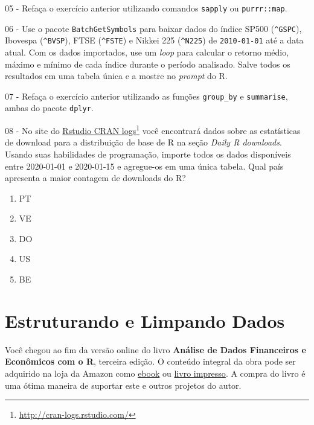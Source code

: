 \documentclass[
  11pt,
]{book}
\providecommand{\tightlist}{%
  \setlength{\itemsep}{0pt}\setlength{\parskip}{0pt}}
\newenvironment{pleasebuyit}
{\begin{noteblock}
		
	} {\end{noteblock}}
\begin{document}
05 -
Refaça o exercício anterior utilizando comandos \texttt{sapply} ou \texttt{purrr::map}.

06 -
Use o pacote \texttt{BatchGetSymbols} para baixar dados do índice SP500 (\texttt{\textquotesingle{}\^{}GSPC\textquotesingle{}}), Ibovespa (\texttt{\textquotesingle{}\^{}BVSP\textquotesingle{}}), FTSE (\texttt{\textquotesingle{}\^{}FSTE\textquotesingle{}}) e Nikkei 225 (\texttt{\textquotesingle{}\^{}N225\textquotesingle{}}) de \texttt{\textquotesingle{}2010-01-01\textquotesingle{}} até a data atual. Com os dados importados, use um \emph{loop} para calcular o retorno médio, máximo e mínimo de cada índice durante o período analisado. Salve todos os resultados em uma tabela única e a mostre no \emph{prompt} do R.

07 -
Refaça o exercício anterior utilizando as funções \texttt{group\_by} e \texttt{summarise}, ambas do pacote \texttt{dplyr}.

08 -
No site do \href{http://cran-logs.rstudio.com/}{Rstudio CRAN logs}\footnote{\url{http://cran-logs.rstudio.com/}} você encontrará dados sobre as estatísticas de download para a distribuição de base de R na seção \emph{Daily R downloads}. Usando suas habilidades de programação, importe todos os dados disponíveis entre 2020-01-01 e 2020-01-15 e agregue-os em uma única tabela. Qual país apresenta a maior contagem de downloads do R?

\begin{enumerate}
\def\labelenumi{\alph{enumi})}
\tightlist
\item
  PT
\item
  VE
\item
  DO
\item
  US
\item
  BE
\end{enumerate}

\hypertarget{limpando-estruturando}{%
\chapter{Estruturando e Limpando Dados}\label{limpando-estruturando}}

\begin{pleasebuyit}
Você chegou ao fim da versão online do livro \textbf{Análise de Dados
Financeiros e Econômicos com o R}, terceira edição. O conteúdo integral
da obra pode ser adquirido na loja da Amazon como
\href{https://www.amazon.com.br/dp/B08WNC27ZY}{ebook} ou
\href{https://www.amazon.com/dp/B08WP8CCDB}{livro impresso}. A compra do
livro é uma ótima maneira de suportar este e outros projetos do autor.
\end{pleasebuyit}
\end{document}
